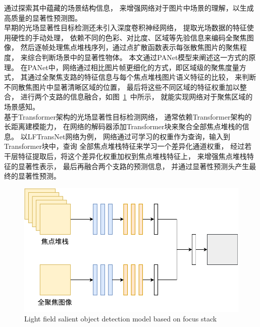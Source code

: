 通过探索其中蕴藏的场景结构信息，
来增强网络对于图片中场景的理解，以生成高质量的显著性预测图。
\\
%
%
%
%
\indent
早期的光场显著性目标检测还未引入深度卷积神经网络，
提取光场数据的特征使用硬性的手动处理，
依赖不同的色彩、对比度、区域等先验信息来编码全聚焦图像，
然后逐帧处理焦点堆栈序列，通过点扩散函数表示每张散焦图片的聚焦程度，
来综合判断场景中的显著性物体。
本文通过PANet模型来阐述这一方式的原理。
在PANet中，网络通过相比图片帧更细化的方式，即区域级的聚焦度量方式，
其通过全聚焦支路的特征信息与每个焦点堆栈图片语义特征的比较，
来判断不同散焦图片中显著清晰区域的位置，
最后将这些不同区域的特征权重加以整合，
进行两个支路的信息融合，如图~\ref{cpt2_fig9:model_of_fs_inputs}~中所示，
就能实现网络对于聚焦区域的场景感知。
\\
%
%
%
%
\indent
基于Transformer架构的光场显著性目标检测网络，
通常依赖Transformer架构的长距离建模能力，
在网络的解码器添加Transformer块来聚合全部焦点堆栈的信息。
以LFTransNet网络为例，
网络通过可学习的权重作为查询，输入到Transformer块中，查询
全部焦点堆栈特征来学习一个差异化通道权重，
经过若干层特征提取后，将这个差异化权重加权到焦点堆栈特征上，
来增强焦点堆栈特征的显著性表示，
最后再融合两个支路的预测信息，
并通过显著性预测头产生最终的显著性预测。
\begin{figure}[t]
	\centering
	\includegraphics[width=0.70\linewidth]{figures/chapter2/model_of_fs_inputs}
	{Light field salient object detection model based on focus stack}  
	\label{cpt2_fig9:model_of_fs_inputs}
\end{figure}
